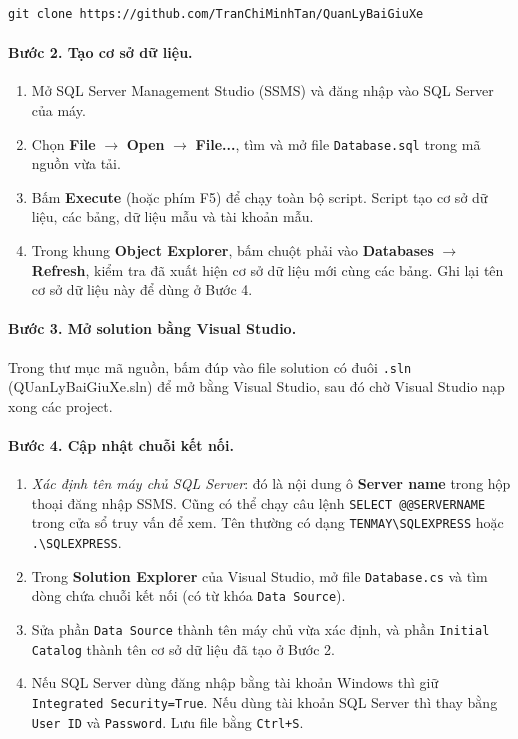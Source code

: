 \begin{lstlisting}[language={},numbers=none]
git clone https://github.com/TranChiMinhTan/QuanLyBaiGiuXe
\end{lstlisting}

 
\paragraph{Bước 2. Tạo cơ sở dữ liệu.}
\begin{enumerate}
  \item Mở SQL Server Management Studio (SSMS) và đăng nhập vào SQL Server của máy.
  \item Chọn \textbf{File} $\rightarrow$ \textbf{Open} $\rightarrow$ \textbf{File...}, tìm và mở file \texttt{Database.sql} trong mã nguồn vừa tải.
  \item Bấm \textbf{Execute} (hoặc phím F5) để chạy toàn bộ script. Script tạo cơ sở dữ liệu, các bảng, dữ liệu mẫu và tài khoản mẫu.
  \item Trong khung \textbf{Object Explorer}, bấm chuột phải vào \textbf{Databases} $\rightarrow$ \textbf{Refresh}, kiểm tra đã xuất hiện cơ sở dữ liệu mới cùng các bảng. Ghi lại tên cơ sở dữ liệu này để dùng ở Bước 4.
\end{enumerate}
 
\paragraph{Bước 3. Mở solution bằng Visual Studio.} Trong thư mục mã nguồn, bấm đúp vào file solution có đuôi \texttt{.sln} (QUanLyBaiGiuXe.sln) để mở bằng Visual Studio, sau đó chờ Visual Studio nạp xong các project.
 
\paragraph{Bước 4. Cập nhật chuỗi kết nối.}
\begin{enumerate}
  \item \textit{Xác định tên máy chủ SQL Server}: đó là nội dung ô \textbf{Server name} trong hộp thoại đăng nhập SSMS. Cũng có thể chạy câu lệnh \texttt{SELECT @@SERVERNAME} trong cửa sổ truy vấn để xem. Tên thường có dạng \texttt{TENMAY\textbackslash SQLEXPRESS} hoặc \texttt{.\textbackslash SQLEXPRESS}.
  \item Trong \textbf{Solution Explorer} của Visual Studio, mở file \texttt{Database.cs} và tìm dòng chứa chuỗi kết nối (có từ khóa \texttt{Data Source}).
  \item Sửa phần \texttt{Data Source} thành tên máy chủ vừa xác định, và phần \texttt{Initial Catalog} thành tên cơ sở dữ liệu đã tạo ở Bước 2.
  \item Nếu SQL Server dùng đăng nhập bằng tài khoản Windows thì giữ \texttt{Integrated Security=True}. Nếu dùng tài khoản SQL Server thì thay bằng \texttt{User ID} và \texttt{Password}. Lưu file bằng \texttt{Ctrl+S}.
\end{enumerate}
 
